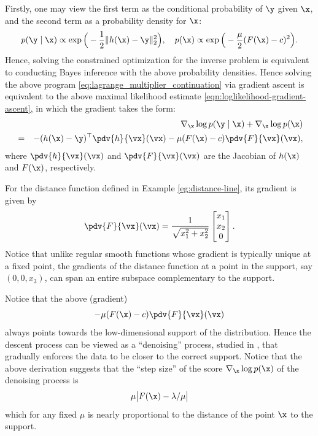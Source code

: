 \documentclass[../../book-main.tex]{subfiles}
\begin{document}
Firstly, one may view the first term as the conditional probability
of $\y$ given $\x$, and the second term as a probability density for $\x$:
\begin{equation}
    p(\y\mid \x) \propto \exp\Big(- \frac{1}{2}\|h(\x) - \y\|_2^2\Big), \quad
    p(\x) \propto \exp\Big( - \frac{\mu}{2}(F(\x) - c)^2\Big).
\end{equation}
Hence, solving the constrained optimization for the inverse problem
is equivalent to conducting Bayes inference with the above
probability densities. Hence solving the above program
\eqref{eq:lagrange_multiplier_continuation} via gradient ascent is
equivalent to the above maximal likelihood estimate
\eqref{eqn:loglikelihood-gradient-ascent},
in which the gradient takes the form:
\begin{eqnarray}
    && \nabla_{\x} \log p(\y \mid \x) + \nabla_{\x} \log p(\x)  \\
    &=&  - (h(\x) - \y)^\top \pdv{h}{\vx}(\vx) -  \mu
    (F(\x) - c) \pdv{F}{\vx}(\vx), \label{eqn:EngMin-gradient}
\end{eqnarray}
where $\pdv{h}{\vx}(\vx)$ and $\pdv{F}{\vx}(\vx)$ are the Jacobian of
$h(\x)$ and $F(\x)$, respectively.
\begin{example}[Gradient of $F(\x)$] For the distance function
    defined in Example \ref{eg:distance-line}, its gradient is given by
    \begin{equation}
        \pdv{F}{\vx}(\vx) =  \frac{1}{\sqrt{x_1^2 + x_2^2}}\left[
            \begin{matrix}
                x_1 \\ x_2 \\ 0
        \end{matrix}\right].
    \end{equation}
    Notice that unlike regular smooth functions whose gradient is
    typically unique at a fixed point, the gradients of the distance
    function at a point in the support, say $(0, 0, x_3)$, can span
    an entire subspace complementary to the support.
\end{example}

Notice that the above (gradient)
$$-  \mu (F(\x) - c) \pdv{F}{\vx}(\vx)$$ always points
towards the low-dimensional support of the distribution. Hence the
descent process can be viewed as a ``denoising'' process, studied in
, that gradually enforces the data to be closer
to the correct support. Notice that the above
derivation suggests that the ``step size'' of the score $\nabla_{\x}
\log p(\x)$ of the denoising process is $$\mu \big| F(\x) -
\lambda/\mu\big|$$ which for any fixed $\mu$ is nearly proportional
to the distance of the point $\x$ to the support.
\end{document}
